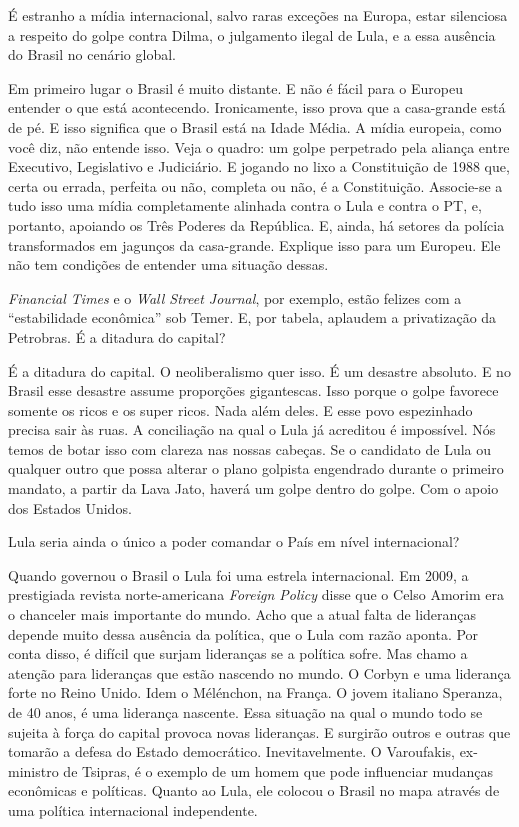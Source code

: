  É estranho a mídia internacional, salvo raras exceções na Europa,
estar silenciosa a respeito do golpe contra Dilma, o julgamento ilegal
de Lula, e a essa ausência do Brasil no cenário global.

 Em primeiro lugar o Brasil é muito distante. E não é fácil para o
Europeu entender o que está acontecendo. Ironicamente, isso prova que a
casa-grande está de pé. E isso significa que o Brasil está na Idade
Média. A mídia europeia, como você diz, não entende isso. Veja o quadro:
um golpe perpetrado pela aliança entre Executivo, Legislativo e
Judiciário. E jogando no lixo a Constituição de 1988 que, certa ou
errada, perfeita ou não, completa ou não, é a Constituição. Associe-se a
tudo isso uma mídia completamente alinhada contra o Lula e contra o PT,
e, portanto, apoiando os Três Poderes da República. E, ainda, há setores
da polícia transformados em jagunços da casa-grande. Explique isso para
um Europeu. Ele não tem condições de entender uma situação dessas.

 \emph{Financial Times} e o \emph{Wall Street Journal}, por exemplo,
estão felizes com a ``estabilidade econômica'' sob Temer. E, por tabela,
aplaudem a privatização da Petrobras. É a ditadura do capital?

 É a ditadura do capital. O neoliberalismo quer isso. É um desastre
absoluto. E no Brasil esse desastre assume proporções gigantescas. Isso
porque o golpe favorece somente os ricos e os super ricos. Nada além
deles. E esse povo espezinhado precisa sair às ruas. A conciliação na
qual o Lula já acreditou é impossível. Nós temos de botar isso com
clareza nas nossas cabeças. Se o candidato de Lula ou qualquer outro que
possa alterar o plano golpista engendrado durante o primeiro mandato, a
partir da Lava Jato, haverá um golpe dentro do golpe. Com o apoio dos
Estados Unidos.

 Lula seria ainda o único a poder comandar o País em nível
internacional?

 Quando governou o Brasil o Lula foi uma estrela internacional. Em
2009, a prestigiada revista norte-americana \emph{Foreign Policy} disse
que o Celso Amorim era o chanceler mais importante do mundo. Acho que a
atual falta de lideranças depende muito dessa ausência da política, que
o Lula com razão aponta. Por conta disso, é difícil que surjam
lideranças se a política sofre. Mas chamo a atenção para lideranças que
estão nascendo no mundo. O Corbyn e uma liderança forte no Reino Unido.
Idem o Mélénchon, na França. O jovem italiano Speranza, de 40 anos, é
uma liderança nascente. Essa situação na qual o mundo todo se sujeita à
força do capital provoca novas lideranças. E surgirão outros e outras
que tomarão a defesa do Estado democrático. Inevitavelmente. O
Varoufakis, ex-ministro de Tsipras, é o exemplo de um homem que pode
influenciar mudanças econômicas e políticas. Quanto ao Lula, ele colocou
o Brasil no mapa através de uma política internacional independente.

